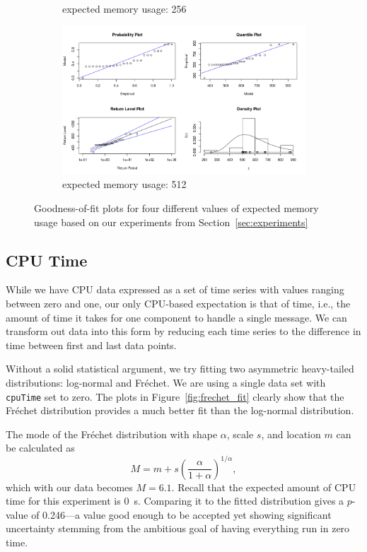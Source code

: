 \documentclass{article}
\begin{document}
\begin{figure}
\begin{subfigure}[t]{0.49\textwidth}
    \caption{expected memory usage: \SI{256}{\mebi\byte}}
  \end{subfigure}
  \begin{subfigure}[t]{0.49\textwidth}
    \centering
    \includegraphics[width=\textwidth]{../plots/memory_fit_512.png}
    \caption{expected memory usage: \SI{512}{\mebi\byte}}
  \end{subfigure}
  \caption{Goodness-of-fit plots for four different values of expected memory
    usage based on our experiments from Section~\ref{sec:experiments}}
  \label{fig:gumbel_fit}
\end{figure}

\subsection{CPU Time}

While we have CPU data expressed as a set of time series with values ranging
between zero and one, our only CPU-based expectation is that of time, i.e., the
amount of time it takes for one component to handle a single message. We can
transform out data into this form by reducing each time series to the difference
in time between first and last data points.

Without a solid statistical argument, we try fitting two asymmetric heavy-tailed
distributions: log-normal and Fr\'{e}chet. We are using a single data set with
\texttt{cpuTime} set to zero. The plots in Figure~\ref{fig:frechet_fit} clearly
show that the Fr\'{e}chet distribution provides a much better fit than the
log-normal distribution.

The mode of the Fr\'{e}chet distribution with shape $\alpha$, scale $s$, and
location $m$ can be calculated as
\[
  M = m + s \left( \frac{\alpha}{1 + \alpha} \right)^{1/\alpha},
\]
which with our data becomes $M = 6.1$. Recall that the expected amount of CPU
time for this experiment is \SI{0}{\second}. Comparing it to the fitted
distribution gives a $p$-value of 0.246---a value good enough to be accepted yet
showing significant uncertainty stemming from the ambitious goal of having
everything run in zero time.
\end{document}

